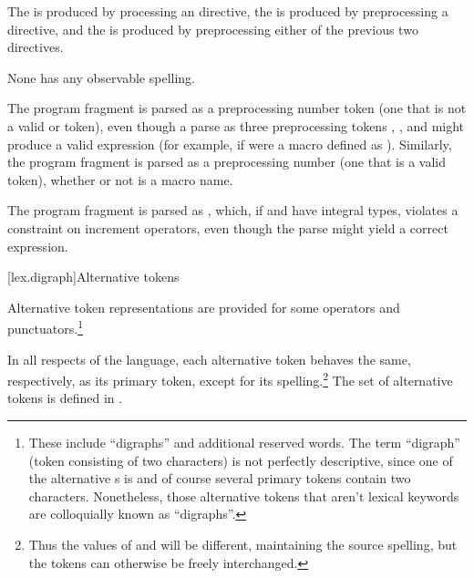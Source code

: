 \pnum
The  is produced
by processing an  directive,
the  is produced
by preprocessing a  directive, and
the  is produced
by preprocessing either of the previous two directives.
\begin{note}
None has any observable spelling.
\end{note}

\pnum
\begin{example}
The program fragment  is parsed as a
preprocessing number token (one that is not a valid
 or  token),
even though a parse as three preprocessing tokens
, \tcode{+}, and  might produce a valid expression (for example,
if  were a macro defined as ). Similarly, the
program fragment  is parsed as a preprocessing number (one
that is a valid  token),
whether or not  is a macro name.
\end{example}

\pnum
\begin{example}
The program fragment  is parsed as , which, if  and  have integral types,
violates a constraint on increment operators, even though the parse
 might yield a correct expression.
\end{example}

[lex.digraph]{Alternative tokens}

\pnum
{}%
Alternative token representations are provided for some operators and
punctuators.\footnote{%
These include ``digraphs'' and additional reserved words. The term
``digraph'' (token consisting of two characters) is not perfectly
descriptive, since one of the alternative s is
\tcode{\%:\%:} and of course several primary tokens contain two
characters. Nonetheless, those alternative tokens that aren't lexical
keywords are colloquially known as ``digraphs''. }

\pnum
In all respects of the language, each alternative token behaves the
same, respectively, as its primary token, except for its spelling.\footnote{Thus the  values of
\tcode{[} and \tcode{<:} will be different, maintaining the source
spelling, but the tokens can otherwise be freely interchanged. }
The set of alternative tokens is defined in
.

